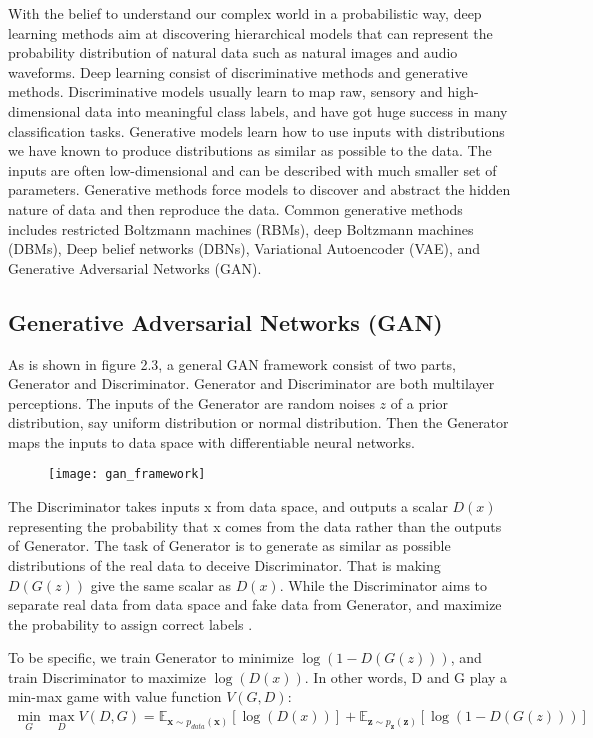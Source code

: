 With the belief to understand our complex world in a probabilistic way, deep learning methods aim at discovering hierarchical models that can represent the probability distribution of natural data such as natural images and audio waveforms. Deep learning consist of discriminative methods and generative methods. Discriminative models usually learn to map raw, sensory and high-dimensional data into meaningful class labels, and have got huge success in many classification tasks. Generative models learn how to use inputs with distributions we have known to produce distributions as similar as possible to the data. The inputs are often low-dimensional and can be described with much smaller set of parameters. Generative methods force models to discover and abstract the hidden nature of data and then reproduce the data. Common generative methods includes restricted Boltzmann machines (RBMs), deep Boltzmann machines (DBMs), Deep belief networks (DBNs), Variational Autoencoder (VAE), and Generative Adversarial Networks (GAN).

\subsection{Generative Adversarial Networks (GAN)\cite{goodfellow2014generative}}
As is shown in figure 2.3, a general GAN framework consist of two parts, Generator and Discriminator. Generator and Discriminator are both multilayer perceptions. The inputs of the Generator are random noises $z$ of a prior distribution, say uniform distribution or normal distribution. Then the Generator maps the inputs to data space with differentiable neural networks.
\begin{figure}
	\centering
	\texttt{[image: gan\_framework]}
	\label{fig:6}
\end{figure}
The Discriminator takes inputs x from data space, and outputs a scalar $D(x)$ representing the probability that x comes from the data rather than the outputs of Generator. The task of Generator is to generate as similar as possible distributions of the real data to deceive Discriminator. That is making $D(G(z))$ give the same scalar as $D(x)$. While the Discriminator aims to separate real data from data space and fake data from Generator, and maximize the probability to assign correct labels .

To be specific, we train Generator to minimize $\log(1-D(G(z)))$, and train Discriminator to maximize $\log(D(x))$. In other words, D and G play a min-max game with value function $V(G,D)$:
\begin{equation}
\begin{aligned}
\min \limits_{G} \max \limits_{D} V(D,G) = \mathbb{E}_{\textbf{x}\sim p_{data}(\textbf{x})}[\log(D(x))]+\mathbb{E}_{\textbf{z}\sim p_{\textbf{z}}(\textbf{z})}[\log(1-D(G(z)))]
\end{aligned}
\end{equation}

